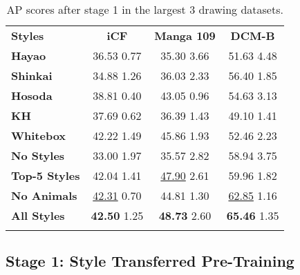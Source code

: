 \documentclass{article}
\begin{document}
\begin{table}
\centering
\begin{tabular}{l|ccc}
    \hline
    \noalign{\smallskip}
    \textbf{Styles} & \textbf{iCF} & \textbf{Manga 109} 
    & \textbf{DCM-B} \\
    \noalign{\smallskip}
    \hline
    \noalign{\smallskip}
    \textbf{Hayao}    
    & 36.53 {\tiny 0.77} & 35.30 {\tiny 3.66} & 51.63 {\tiny 4.48} \\
    
    \textbf{Shinkai}  
    & 34.88 {\tiny 1.26} & 36.03 {\tiny 2.33} & 56.40 {\tiny 1.85}\\
    
    \textbf{Hosoda}   
    & 38.81 {\tiny 0.40} & 43.05 {\tiny 0.96} & 54.63 {\tiny 3.13} \\
    
    \textbf{KH}       
    & 37.69 {\tiny 0.62} & 36.39 {\tiny 1.43} & 49.10 {\tiny 1.41} \\
    
    \textbf{Whitebox} 
    & 42.22 {\tiny 1.49} & 45.86 {\tiny 1.93} & 52.46 {\tiny 2.23}\\
    
    \noalign{\smallskip}
    \hline
    \noalign{\smallskip}
    
    \textbf{No Styles}  
    & 33.00 {\tiny 1.97} & 35.57 {\tiny 2.82} & 58.94 {\tiny 3.75} \\

    \textbf{Top-5 Styles} 
    & 42.04 {\tiny 1.41} & \underline{47.90} {\tiny 2.61} & 59.96 {\tiny 1.82} \\
    
    \textbf{No Animals} 
    & \underline{42.31} {\tiny 0.70} & 44.81 {\tiny 1.30} & \underline{62.85} {\tiny 1.16} \\

    \textbf{All Styles} 
    & \textbf{42.50} {\tiny 1.25} & \textbf{48.73} {\tiny 2.60} & \textbf{65.46} {\tiny 1.35}  \\
    
    \noalign{\smallskip}
    \hline
\end{tabular}
\caption{AP scores after stage 1 in the largest 3 drawing datasets.}
\label{table:stage1_results}
\end{table} 
\subsection{Stage 1: Style Transferred Pre-Training}
\label{res:sty_train}
\end{document}
